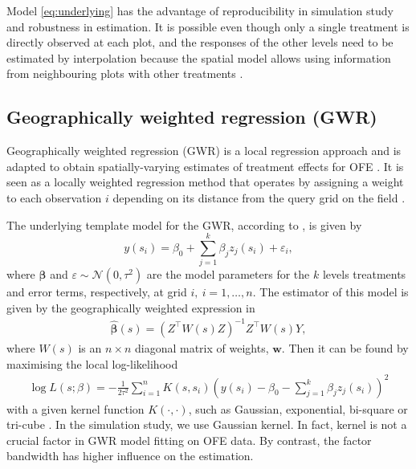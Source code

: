\documentclass[a4paper]{article} 	%
\newcommand{\N}{\mathcal{N}}
\begin{document}
Model \eqref{eq:underlying} has the advantage of reproducibility in simulation study and robustness in estimation. It is possible even though only a single treatment is directly observed at each plot, and the responses of the other levels need to be estimated by interpolation because the spatial model allows using information from neighbouring plots with other treatments \parencite{Panten2010Enhancing, Piepho2011Statistical}. 




\subsection{Geographically weighted regression (GWR)}\label{sec:gwr}

Geographically weighted regression (GWR) is a local regression approach and is adapted to obtain spatially-varying estimates of treatment effects for OFE \parencite{Rakshit2020Novel}.  It is seen as a locally weighted regression method that operates by assigning a weight to each observation $i$ depending on its distance from the query grid on the field \parencite{Paez2002General}. 




The underlying template model for the GWR, according to \textcite{Leung2000Statistical}, is given by 
\begin{equation}\label{eq:basicgwr}
	y(s_i) = \beta_0 + \sum_{j=1}^{k} \beta_jz_j(s_i)+\varepsilon_i, 
\end{equation}
where $\bm{\beta}$ and $\varepsilon\sim \N(0,\tau^2)$ are the model parameters for the $k$ levels treatments and error terms, respectively, at grid $i,\ i=1,\ldots,n$. The estimator of this model is given by the geographically weighted expression in 
\begin{eqnarray}\label{eq:betahat}
	\bm{\hat{\beta}}(s) = \left( Z^\top W(s) Z \right)^{-1}Z^\top W(s) Y,
\end{eqnarray}
where $W(s)$ is an $n\times n$ diagonal matrix of weights, $\bm{w}$. Then it can be found by maximising the local log-likelihood 
\begin{eqnarray}\label{eq:locallog}
	\log L(s;\beta) = - \frac{1}{2\tau^2}\sum_{i=1}^{n}K(s,s_i)\left( y(s_i) -\beta_0 - \sum_{j=1}^{k}\beta_jz_j(s_i) \right)^2 
\end{eqnarray}
with a given kernel function $K(\cdot,\cdot)$, such as Gaussian, exponential, bi-square or tri-cube \parencite{Gollini2015GWmodel}. In the simulation study, we use Gaussian kernel. In fact, kernel is not a crucial factor in GWR model fitting on OFE data. By contrast, the factor bandwidth has higher influence on the estimation.  
\end{document}
